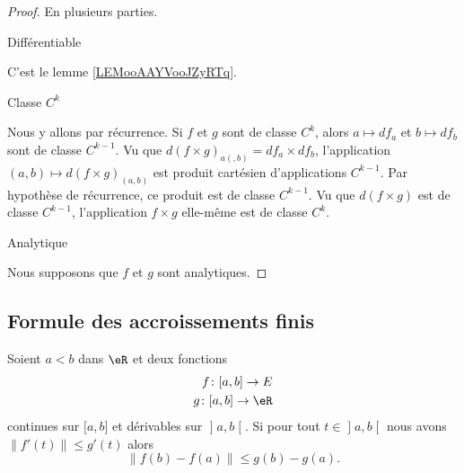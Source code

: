 \begin{proof}
	En plusieurs parties.
	\begin{proofpart}
		Différentiable
	\end{proofpart}
	C'est le lemme \ref{LEMooAAYVooJZyRTq}.
	\begin{proofpart}
		Classe \( C^k\)
	\end{proofpart}
	Nous y allons par récurrence. Si  \( f\) et \( g\) sont de classe \( C^k\), alors \( a\mapsto df_a\) et \( b\mapsto df_b\) sont de classe \( C^{k-1}\). Vu que \( d(f\times g)_{a(,b)}=df_a\times df_b\), l'application \( (a,b)\mapsto  d(f\times g)_{(a,b)}\) est produit cartésien d'applications \( C^{k-1}\). Par hypothèse de récurrence, ce produit est de classe \( C^{k-1}\). Vu que \( d(f\times g)\) est de classe \( C^{k-1}\), l'application \( f\times g\) elle-même est de classe \( C^k\).
	\begin{proofpart}
		Analytique
	\end{proofpart}
	Nous supposons que \( f\) et \( g\) sont analytiques.
\end{proof}

\subsection{Formule des accroissements finis}

\begin{proposition} \label{PropDQLhSoy}
	Soient \( a<b\) dans \( \eR\) et deux fonctions
	\begin{subequations}
		\begin{align}
			f\colon \mathopen[ a , b \mathclose]\to E \\
			g\colon \mathopen[ a , b \mathclose]\to \eR
		\end{align}
	\end{subequations}
	continues sur \( \mathopen[ a , b \mathclose]\) et dérivables sur \( \mathopen] a , b \mathclose[\). Si pour tout \( t\in\mathopen] a , b \mathclose[\) nous avons \( \| f'(t) \|\leq g'(t)\) alors
	\begin{equation}
		\| f(b)-f(a) \|\leq g(b)-g(a).
	\end{equation}
\end{proposition}

